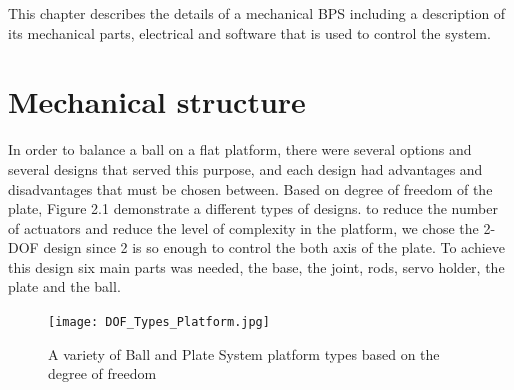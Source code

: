 \graphicspath{ {Figures/chapter02} }


This chapter describes the details of a mechanical BPS including a description of its mechanical parts, electrical and software that is used to control the system.

\section{Mechanical structure}
In order to balance a ball on a flat platform, there were several options and several designs that served this purpose, and each design had advantages and disadvantages that must be chosen between. Based on degree of freedom of the plate, Figure 2.1 demonstrate a different types of designs. to reduce the number of actuators and reduce the level of complexity in the platform, we chose the 2-DOF design since 2 is so enough to control the both axis of the plate.
To achieve this design six main parts was needed, the base, the joint, rods, servo holder, the plate and the ball.
\begin{figure}[h]
    \centering
    \texttt{[image: DOF\_Types\_Platform.jpg]}
    \caption{A variety of Ball and Plate System platform types based on the degree of freedom}
\end{figure}

